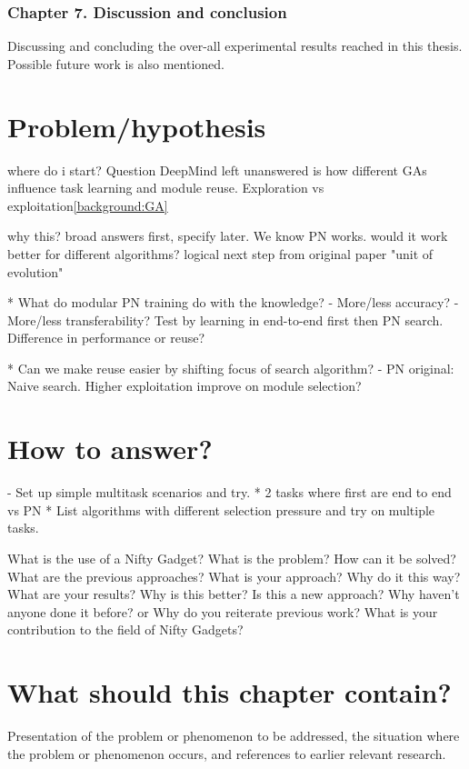 \subsubsection{Chapter 7. Discussion and conclusion}
Discussing and concluding the over-all experimental results reached in this thesis. Possible future work is also mentioned. 



\iffalse
\section{Problem/hypothesis}

where do i start?
Question DeepMind left unanswered is how different GAs influence task learning and module reuse. 
Exploration vs exploitation\ref{background:GA}

why this? broad answers first, specify later. 
We know PN works. would it work better for different algorithms?
logical next step from original paper "unit of evolution"




* What do modular PN training do with the knowledge? 
- More/less accuracy?
- More/less transferability? 
Test by learning in end-to-end first then PN search. 
Difference in performance or reuse?

* Can we make reuse easier by shifting focus of search algorithm?
- PN original: Naive search. Higher exploitation improve on module selection?

\section{How to answer?}
- Set up simple multitask scenarios and try. 
* 2 tasks where first are end to end vs PN
* List algorithms with different selection pressure and try on multiple tasks. 


    What is the use of a Nifty Gadget? 
    What is the problem? 
    How can it be solved? 
    What are the previous approaches? 
    What is your approach? 
    Why do it this way? 
    What are your results? 
    Why is this better? 
    Is this a new approach? 
    Why haven't anyone done it before? 
    or
    Why do you reiterate previous work? 
    What is your contribution to the field of Nifty Gadgets? 
    
    \section{What should this chapter contain?}
    Presentation of the problem or phenomenon to be addressed, the situation where the problem or phenomenon occurs, and references to earlier relevant research. 
